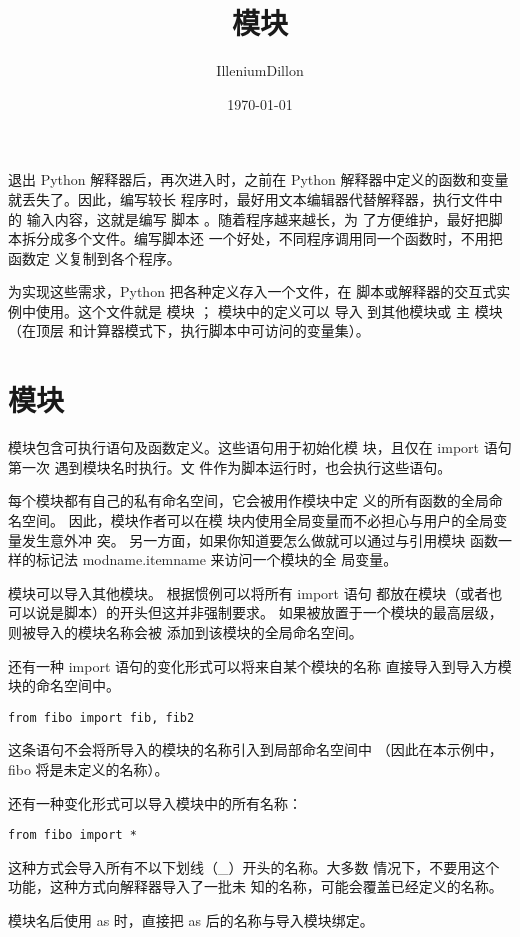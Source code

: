 \documentclass[a4paper, 12pt]{article}
\begin{document}
\title{模块}
\author{IlleniumDillon}
\date{\today}
\maketitle
退出 Python 解释器后，再次进入时，之前在 Python 
解释器中定义的函数和变量就丢失了。因此，编写较长
程序时，最好用文本编辑器代替解释器，执行文件中的
输入内容，这就是编写 脚本 。随着程序越来越长，为
了方便维护，最好把脚本拆分成多个文件。编写脚本还
一个好处，不同程序调用同一个函数时，不用把函数定
义复制到各个程序。\par
为实现这些需求，Python 把各种定义存入一个文件，在
脚本或解释器的交互式实例中使用。这个文件就是 模块 ；
模块中的定义可以 导入 到其他模块或 主 模块（在顶层
和计算器模式下，执行脚本中可访问的变量集）。\par

\section{模块}
模块包含可执行语句及函数定义。这些语句用于初始化模
块，且仅在 import 语句 第一次 遇到模块名时执行。文
件作为脚本运行时，也会执行这些语句。\par
每个模块都有自己的私有命名空间，它会被用作模块中定
义的所有函数的全局命名空间。 因此，模块作者可以在模
块内使用全局变量而不必担心与用户的全局变量发生意外冲
突。 另一方面，如果你知道要怎么做就可以通过与引用模块
函数一样的标记法 modname.itemname 来访问一个模块的全
局变量。\par
模块可以导入其他模块。 根据惯例可以将所有 import 语句
都放在模块（或者也可以说是脚本）的开头但这并非强制要求。
如果被放置于一个模块的最高层级，则被导入的模块名称会被
添加到该模块的全局命名空间。\par
还有一种 import 语句的变化形式可以将来自某个模块的名称
直接导入到导入方模块的命名空间中。\par
\begin{listing}[h!]
\begin{verbatim}
from fibo import fib, fib2
\end{verbatim}
\end{listing}
这条语句不会将所导入的模块的名称引入到局部命名空间中
（因此在本示例中，fibo 将是未定义的名称）。\par
还有一种变化形式可以导入模块中的所有名称：\par
\begin{listing}[h!]
\begin{verbatim}
from fibo import *
\end{verbatim}
\end{listing}
这种方式会导入所有不以下划线（\_）开头的名称。大多数
情况下，不要用这个功能，这种方式向解释器导入了一批未
知的名称，可能会覆盖已经定义的名称。\par
模块名后使用 as 时，直接把 as 后的名称与导入模块绑定。\par
\end{document}
